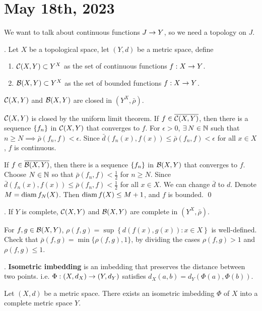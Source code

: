 \section*{May 18th, 2023}

We want to talk about continuous functions \(J \rightarrow Y\), so we need a topology on \(J\).

. Let \(X\) be a topological space, let \((Y, d)\) be a metric space, define
\begin{enumerate}
    \item \(\mathcal{C}(X, Y) \subset Y^X\) as the set of continuous functions \(f : X \rightarrow Y\).
    \item \(\mathcal{B}(X, Y) \subset Y^X\) as the set of bounded functions \(f : X \rightarrow Y\).
\end{enumerate}

 \(\mathcal{C}(X, Y)\) and \(\mathcal{B}(X, Y)\) are closed in \((Y^X, \bar{\rho})\).

\pf \(\mathcal{C}(X, Y)\) is closed by the uniform limit theorem. If \(f \in \overline{\mathcal{C}(X, Y)}\), then there is a sequence \(\left\{ f_n \right\}\) in \(\mathcal{C}(X, Y)\) that converges to \(f\). For \(\epsilon > 0\), \(\exists N \in \N\) such that \(n \geq N \implies \bar{\rho}(f_n, f) < \epsilon\). Since \(\bar{d}(f_n(x), f(x)) \leq \bar{\rho}(f_n, f) < \epsilon\) for all \(x \in X\), \(f\) is continuous.

If \(f \in \overline{\mathcal{B}(X, Y)}\), then there is a sequence \(\left\{ f_n \right\}\) in \(\mathcal{B}(X, Y)\) that converges to \(f\). Choose \(N \in \mathbb{N}\) so that \(\bar{\rho}(f_n, f) < \frac{1}{2}\) for \(n \geq N\). Since \(\bar{d}(f_n(x), f(x)) \leq \bar{\rho}(f_n, f) < \frac{1}{2}\) for all \(x \in X\). We can change \(\bar{d}\) to \(d\). Denote \(M = \operatorname{diam} f_N(X)\). Then \(\operatorname{diam} f(X) \leq M + 1\), and \(f\) is bounded. \qed

\cor. If \(Y\) is complete, \(\mathcal{C}(X, Y)\) and \(\mathcal{B}(X, Y)\) are complete in \((Y^X, \bar{\rho})\).

\rmk For \(f, g \in \mathcal{B}(X, Y)\), \(\rho(f, g) = \sup\left\{d(f(x), g(x)) : x\in X\right\}\) is well-defined. Check that \(\bar{\rho}(f, g) = \min\{\rho(f, g), 1\}\), by dividing the cases \(\rho(f, g) > 1\) and \(\rho(f, g) \leq 1\).

.  \textbf{Isometric imbedding} is an imbedding that preserves the distance between two points. i.e. \(\Phi : (X, d_X) \rightarrow (Y, d_Y)\) satisfies \(d_X(a, b) = d_Y(\Phi(a), \Phi(b))\).

 Let \((X, d)\) be a metric space. There exists an isometric imbedding \(\Phi\) of \(X\) into a complete metric space \(Y\).


